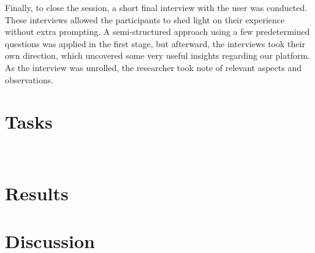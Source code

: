 Finally, to close the session, a short final interview with the user was conducted. These interviews allowed the participants to shed light on their experience without extra prompting. A semi-structured approach using a few predetermined questions was applied in the first stage, but afterward, the interviews took their own direction, which uncovered some very useful insights regarding our platform. As the interview was unrolled, the researcher took note of relevant aspects and observations.

\section{Tasks}
~\label{sub:tasks}

\section{Results}

\section{Discussion}